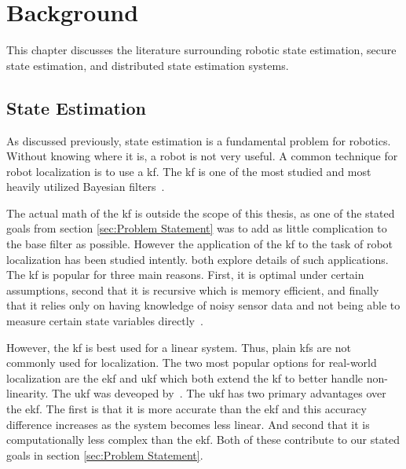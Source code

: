 \documentclass[thesis.tex]{subfile}
\begin{document}
\chapter{Background} \label{ch:Background}
This chapter discusses the literature surrounding robotic state estimation, secure state estimation, and distributed state estimation systems.

\section{State Estimation}
As discussed previously, state estimation is a fundamental problem for robotics. Without knowing where it is, a robot is not very useful. A common technique for robot localization is to use a \gls{kf}. The \gls{kf} is one of the most studied and most heavily utilized Bayesian filters~\cite[39-81]{ProbabilisticRobotics}. %

The actual math of the \gls{kf} is outside the scope of this thesis, as one of the stated goals from section \ref{sec:Problem Statement} was to add as little complication to the base filter as possible. However the application of the \gls{kf} to the task of robot localization has been studied intently. \textcite{Localization2003, Mohsin2014} both explore details of such applications. The \gls{kf} is popular for three main reasons. First, it is optimal under certain assumptions, second that it is recursive which is memory efficient, and finally that it relies only on having knowledge of noisy sensor data and not being able to measure certain state variables directly~\cite{Mohsin2014}.

However, the \gls{kf} is best used for a linear system. Thus, plain \glspl{kf} are not commonly used for localization. The two most popular options for real-world localization are the \gls{ekf} and \gls{ukf} which both extend the \gls{kf} to better handle non-linearity. The \gls{ukf} was deveoped by~\textcite{Julier1997}. The \gls{ukf} has two primary advantages over the \gls{ekf}. The first is that it is more accurate than the \gls{ekf} and this accuracy difference increases as the system becomes less linear. And second that it is computationally less complex than the \gls{ekf}. Both of these contribute to our stated goals in section \ref{sec:Problem Statement}.
\end{document}
